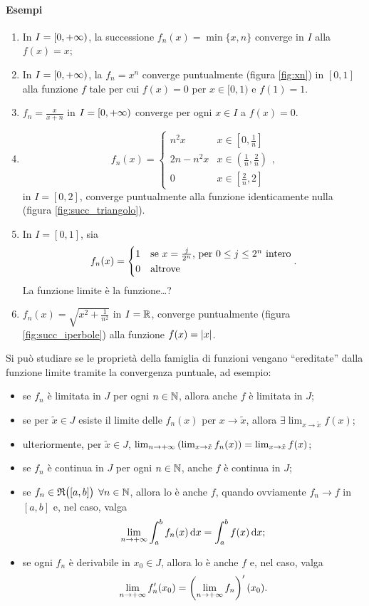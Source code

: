 \paragraph{Esempi}
\begin{enumerate}
\item In $I=[0,+\infty)$, la successione $f_n(x)=\min\{x,n\}$ converge in $I$ alla $f(x)=x$;
\item In $I=[0,+\infty)$, la $f_n=x^n$ converge puntualmente (figura \ref{fig:xn}) in $[0,1]$ alla funzione $f$ tale per cui $f(x)=0$ per $x\in[0,1)$ e $f(1)=1$.

\item $f_n=\frac{x}{x+n}$ in $I=[0,+\infty)$ converge per ogni $x\in I$ a $f(x)=0$.
\item\[
f_n(x)=\begin{cases}n^2x&x\in[0,\frac1{n}]\\ 2n-n^2x&x\in(\frac1{n},\frac2{n})\\ 0&x\in[\frac2{n},2]\end{cases},
\]
in $I=[0,2]$, converge puntualmente alla funzione identicamente nulla (figura \ref{fig:succ_triangolo}).

\item In $I=[0,1]$, sia
\[
f_n(x)=\begin{cases*}1&se $x=\frac{j}{2^n}$, per $0\leq j\leq 2^n$ intero\\ 0&altrove\end{cases*}.
\]
La funzione limite è la funzione\dots?
\item $f_n(x)=\sqrt{x^2+\frac1{n^2}}$ in $I=\mathbb{R}$, converge puntualmente (figura \ref{fig:succ_iperbole}) alla funzione $f(x)=\left|{x}\right|$.

\end{enumerate}
Si può studiare se le proprietà della famiglia di funzioni vengano ``ereditate'' dalla funzione limite tramite la convergenza puntuale, ad esempio:
\begin{itemize}
\item se $f_n$ è limitata in $J$ per ogni $n\in\mathbb{N}$, allora anche $f$ è limitata in $J$;
\item se per $\tilde{x}\in J$ esiste il limite delle $f_n(x)$ per $x\to\tilde{x}$, allora $\exists\lim_{x\to\tilde{x}}f(x)$;
\item ulteriormente, per $\tilde{x}\in J$, $\lim_{n\to+\infty}\left(\lim_{x\to\tilde{x}}f_n(x)\right)=\lim_{x\to\tilde{x}}f(x)$;
\item se $f_n$ è continua in $J$ per ogni $n\in\mathbb{N}$, anche $f$ è continua in $J$;
\item se $f_n\in\mathfrak{R}\big([a,b]\big)$ $\forall n\in\mathbb{N}$, allora lo è anche $f$, quando ovviamente $f_n\to f$ in $[a,b]$ e, nel caso, valga
\[
\lim_{n\to+\infty}\int_a^bf_n(x)\,\textup{d} x=\int_a^bf(x)\,\textup{d} x;
\]
\item se ogni $f_n$ è derivabile in $x_0\in J$, allora lo è anche $f$ e, nel caso, valga
\[
\lim_{n\to+\infty}f_n'(x_0)=\left(\lim_{n\to+\infty}f_n\right)'(x_0).
\]
\end{itemize}
